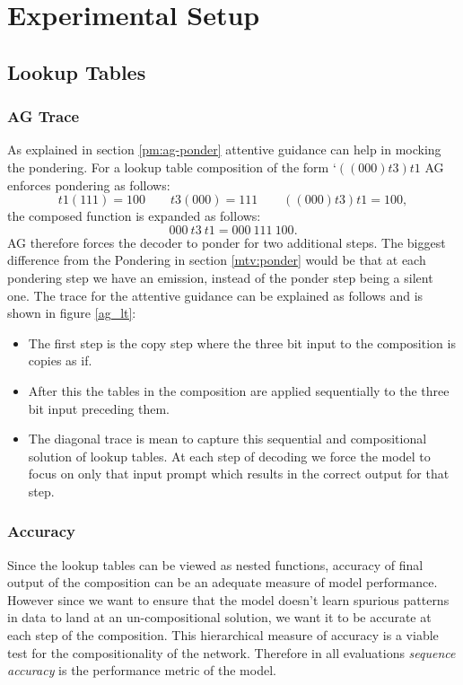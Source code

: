\chapter{Experimental Setup}\label{Chapter:experiments}


\section{Lookup Tables} \label{exp:lt}

\subsection{AG Trace}
As explained in section \ref{pm:ag-ponder} attentive guidance can help in mocking the pondering. For a lookup table composition of the form \lq $((000)t3)t1$ AG enforces pondering as follows:
\begin{equation}
t1(111) = 100 \qquad t3(000) = 111 \qquad ((000)t3)t1 = 100,
\end{equation}
the composed function is expanded as follows:
\begin{equation}
000\ t3\ t1 = 000\ 111\ 100.
\end{equation}
AG therefore forces the decoder to ponder for two additional steps. The biggest difference from the Pondering in section \ref{mtv:ponder} would be that at each pondering step we have an emission, instead of the ponder step being a silent one. The trace for the attentive guidance can be explained as follows and is shown in figure \ref{ag_lt}:
\begin{itemize}
	\item The first step is the copy step where the three bit input to the composition is copies as if.
	\item After this the tables in the composition are applied sequentially to the three bit input preceding them.
	\item The diagonal trace is mean to capture this sequential and compositional solution of lookup tables. At each step of decoding we force the model to focus on only that input prompt which results in the correct output for that step.
\end{itemize}


\subsection{Accuracy}
Since the lookup tables can be viewed as nested functions, accuracy of final output of the composition can be an adequate measure of model performance. However since we want to ensure that the model doesn't learn spurious patterns in data to land at an un-compositional solution, we want it to be accurate at each step of the composition. This hierarchical measure of accuracy is a viable test for the compositionality of the network. Therefore in all evaluations \textit{sequence accuracy} is the performance metric of the model.

